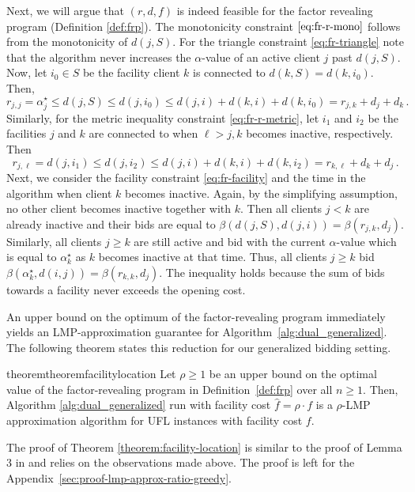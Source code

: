 Next, we will argue that $(r, d, f)$ is indeed feasible for the factor revealing program (Definition \ref{def:frp}).  The monotonicity constraint $\eqref{eq:fr-r-mono}$ follows from the monotonicity of $d(j,S)$. For the triangle constraint \eqref{eq:fr-triangle} note that the algorithm never increases the $\alpha$-value of an active client $j$ past $d(j,S)$. Now, let $i_0 \in S$ be the facility client $k$ is connected to $d(k,S) = d(k,i_0)$. Then,
\begin{equation*}
    r_{j,j} = \alpha^\star_j \leq d(j,S) \le d(j,i_0) \le d(j,i) + d(k,i) + d(k,i_0) = r_{j,k} + d_j + d_k\,.
\end{equation*}
Similarly, for the metric inequality constraint \eqref{eq:fr-r-metric}, let $i_1$ and $i_2$ be the facilities $j$ and $k$ are connected to when $\ell > j,k$ becomes inactive, respectively. Then
\begin{equation*}
    r_{j,\ell} = d(j, i_1) \le d(j,i_2) \le d(j,i) + d(k,i) + d(k,i_2) = r_{k,\ell} + d_k + d_j\,.
\end{equation*}
Next, we consider the facility constraint \eqref{eq:fr-facility} and the time in the algorithm when client $k$ becomes inactive. 
Again, by the simplifying assumption, no other client becomes inactive together with $k$. Then all clients $j < k$ are already inactive and their bids are equal to $ \beta(d(j,S), d(j,i)) = \beta(r_{j,k}, d_j)$. Similarly, all clients $j \ge k$ are still active and bid with the current $\alpha$-value which is equal to $\alpha^\star_k$ as $k$ becomes inactive at that time. Thus, all clients $j \ge k$ bid $\beta(\alpha^\star_k, d(i,j)) = \beta(r_{k,k}, d_j)$. The inequality holds because the sum of bids towards a facility never exceeds the opening cost.   


An upper bound on the optimum of the factor-revealing program immediately yields an LMP-approximation guarantee for Algorithm~\ref{alg:dual_generalized}. The following theorem states this reduction for our generalized bidding setting. 

\begin{restatable}{theorem}{theoremfacilitylocation}
\label{theorem:facility-location}
    Let $\rho \geq 1$ be an upper bound on the optimal value of the factor-revealing program in Definition~\ref{def:frp} over all $n \geq 1$.
    Then, Algorithm \ref{alg:dual_generalized} run with facility cost $\hat{f} = \rho \cdot f$ is a $\rho$-LMP approximation algorithm for UFL instances with facility cost $f$.
\end{restatable}
The proof of Theorem \ref{theorem:facility-location} is similar to the proof of Lemma 3 in \cite{JMS02} and relies on the observations made above. The proof is left for the Appendix~\ref{sec:proof-lmp-approx-ratio-greedy}. 

